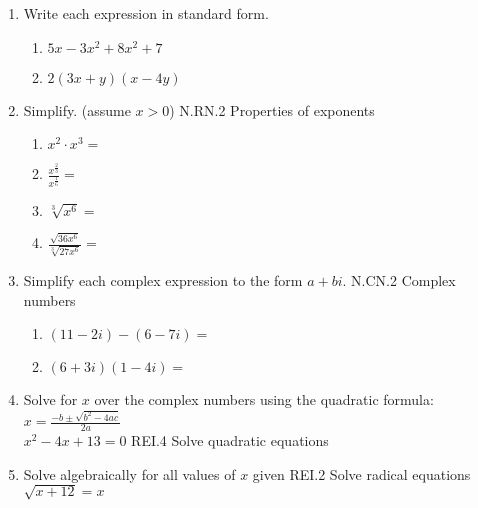 \documentclass[12pt, twoside]{article}
\begin{document}
\begin{enumerate}[itemsep=0.5cm]
\item Write each expression in standard form.
    \begin{multicols}{2}
    \begin{enumerate}[itemsep=0.5cm]
        \item $5x-3x^2+8x^2+7$
        \item $2(3x+y)(x-4y)$
    \end{enumerate}
    \end{multicols} \vspace{4cm}

\newpage
\item Simplify. (assume $x > 0$) \hfill N.RN.2 Properties of exponents
    \begin{multicols}{2}
    \begin{enumerate}[itemsep=1cm]
        \item $x^2 \cdot x^3 =$
        \item $\displaystyle \frac{x^{\frac{2}{3}}}{x^{\frac{1}{6}}} =$
        \item $\sqrt[3]{x^6} =$
        \item $\displaystyle \frac{\sqrt{36x^6}}{\sqrt[3]{27x^6}} = $
    \end{enumerate}
    \end{multicols} \vspace{1cm}


\item Simplify each complex expression to the form $a+bi$. \hfill N.CN.2 Complex numbers
    \begin{multicols}{2}
    \begin{enumerate}
        \item $(11-2i) - (6-7i)=$
        \item $(6+3i)(1-4i)=$
    \end{enumerate}
    \end{multicols} \vspace{3cm}

\item Solve for $x$ over the complex numbers using the quadratic formula:
$\displaystyle x = \frac{-b \pm \sqrt{b^2-4ac}}{2a}$ \\[0.25cm]
$x^2-4x+13=0$ \hfill REI.4 Solve quadratic equations
\vspace{3cm}


\item Solve algebraically for all values of $x$ given \hfill REI.2 Solve radical equations \\[0.25cm]
$\sqrt{x+12}=x$



\end{enumerate}
\end{document}
